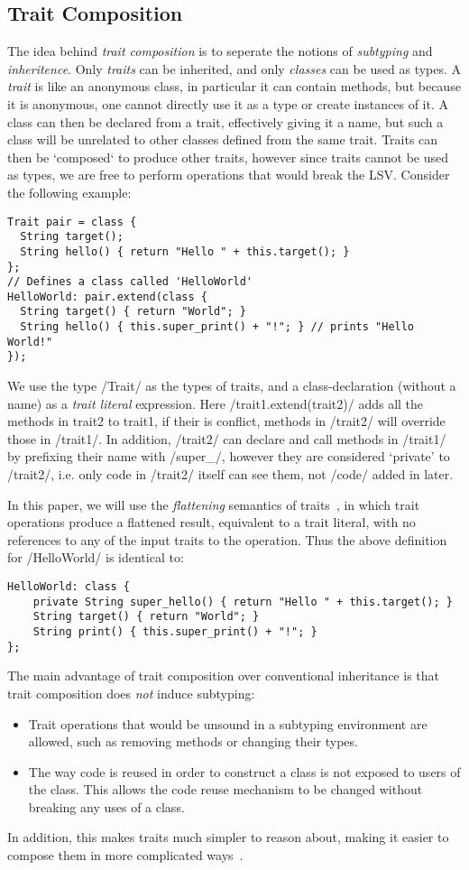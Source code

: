 \subsection{Trait Composition}
The idea behind \emph{trait composition} is to seperate the notions of \emph{subtyping} and \emph{inheritence}. Only \emph{traits} can be inherited, and only \emph{classes} can be used as types. A \emph{trait} is like an anonymous class, in particular it can contain methods, but because it is anonymous, one cannot directly use it as a type or create instances of it. A class can then be declared from a trait, effectively giving it a name, but such a class will be unrelated to other classes defined from the same trait. Traits can then be `composed` to produce other traits, however since traits cannot be used as types, we are free to perform operations that would break the LSV. Consider the following example:
\begin{lstlisting}
Trait pair = class {
  String target();
  String hello() { return "Hello " + this.target(); }
};
// Defines a class called 'HelloWorld'
HelloWorld: pair.extend(class {
  String target() { return "World"; }
  String hello() { this.super_print() + "!"; } // prints "Hello World!"
});
\end{lstlisting}
We use the type /Trait/ as the types of traits, and a class-declaration (without a name) as a \emph{trait literal} expression. Here /trait1.extend(trait2)/ adds all the methods in trait2 to trait1, if their is conflict, methods in /trait2/ will override those in /trait1/. In addition, /trait2/ can declare and call methods in /trait1/ by prefixing their name with /super_/, however they are considered `private' to /trait2/, i.e. only code in /trait2/ itself can see them, not /code/ added in later.

In this paper, we will use the \emph{flattening} semantics of traits~\cite{?}, in which trait operations produce a flattened result, equivalent to a trait literal, with no references to any of the input traits to the operation. Thus the above definition for /HelloWorld/ is identical to:
\begin{lstlisting}
HelloWorld: class {
	private String super_hello() { return "Hello " + this.target(); }
	String target() { return "World"; }
	String print() { this.super_print() + "!"; }
};
\end{lstlisting}

The main advantage of trait composition over conventional inheritance is that trait composition does \emph{not} induce subtyping:
\begin{itemize}
	\item Trait operations that would be unsound in a subtyping environment are allowed, such as removing methods or changing their types.
	\item The way code is reused in order to construct a class is not exposed to users of the class. This allows the code reuse mechanism to be changed without breaking any uses of a class.
\end{itemize}
In addition, this makes traits much simpler to reason about, making it easier to compose them in more complicated ways~\cite{?}.